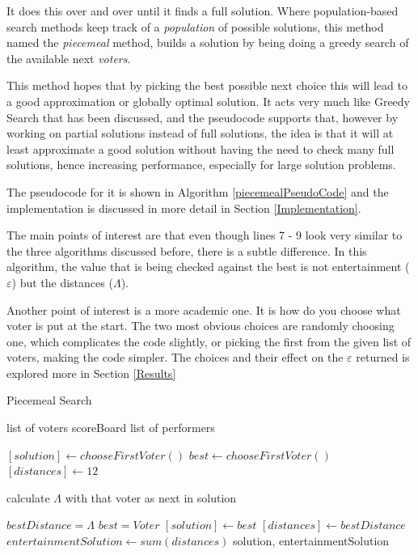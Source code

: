 \documentclass[12pt]{report}
\begin{document}
It does this over and over until it finds a full solution. Where population-based search methods keep track of a \textit{population} of possible solutions, this method named the \textit{piecemeal} method, builds a solution by being doing a greedy search of the available next \textit{voters}.

This method hopes that by picking the best possible next choice this will lead to a good approximation or globally optimal solution. It acts very much like Greedy Search that has been discussed, and the pseudocode supports that, however by working on partial solutions instead of full solutions, the idea is that it will at least approximate a good solution without having the need to check many full solutions, hence increasing performance, especially for large solution problems.

The pseudocode for it is shown in Algorithm \ref{piecemealPseudoCode} and the implementation is discussed in more detail in Section \ref{Implementation}.

The main points of interest are that even though lines 7 - 9 look very similar to the three algorithms discussed before, there is a subtle difference. In this algorithm, the value that is being checked against the best is not entertainment ($\varepsilon$) but the distances ($\Lambda$).

Another point of interest is a more academic one. It is how do you choose what voter is put at the start. The two most obvious choices are randomly choosing one, which complicates the code slightly, or picking the first from the given list of voters, making the code simpler. The choices and their effect on the $\varepsilon$ returned is explored more in Section \ref{Results}

\begin{algorithm}
\caption{Piecemeal Search}
\label{piecemealPseudoCode}
\begin{algorithmic}[1]
\REQUIRE list of voters
\REQUIRE scoreBoard
\REQUIRE list of performers

\STATE $[solution] \leftarrow chooseFirstVoter()$
\STATE $best \leftarrow chooseFirstVoter()$
\STATE $[distances] \leftarrow 12$

\STATE calculate $\Lambda$ with that voter as next in solution

\STATE $bestDistance= \Lambda$
\STATE $best = Voter$
\ENDIF
\ENDFOR
\STATE $[solution] \leftarrow best$
\STATE $[distances] \leftarrow bestDistance$
\ENDFOR
\STATE $entertainmentSolution \leftarrow sum(distances)$
\RETURN solution, entertainmentSolution
\end{algorithmic}
\end{algorithm}
\end{document}
